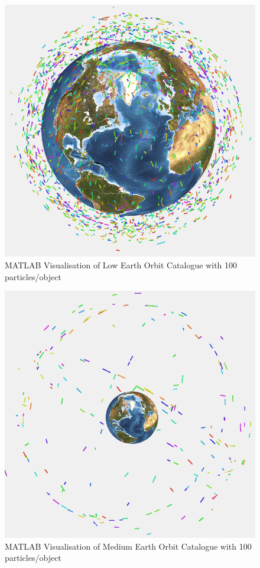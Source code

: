 \documentclass[12pt,openany,a4paper]{book}
\begin{document}
			\begin{figure}[H]
				\centering
				\caption{MATLAB Visualisation of Low Earth Orbit Catalogue with 100 particles/object}
				\label{cLEO}
				\includegraphics[scale=0.45]{p100LEO.png}
			\end{figure}

			\begin{figure}[H]
				\centering
				\caption{MATLAB Visualisation of Medium Earth Orbit Catalogue with 100 particles/object}
				\label{cMEO}
				\includegraphics[scale=0.5]{c100MEO.png}
			\end{figure}
			
\end{document}

